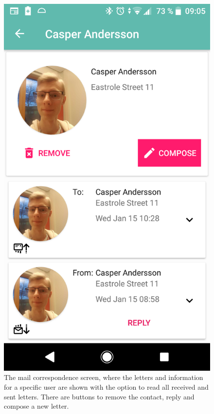 \documentclass[acmlarge, review=false, screen=true]{acmart}
\begin{document}
\begin{figure}[!tbp]
\begin{minipage}[b]{0.4\textwidth}
        \end{minipage}
        \hfill
        \begin{minipage}[b]{0.4\textwidth}
          \includegraphics[width=\textwidth]{images/usertouser.png}
          \caption{The mail correspondence screen, where the letters and information for a specific user are shown with the option to read all received and sent letters. There are buttons to remove the contact, reply and compose a new letter.}
          \label{fig:usertouser}
        \end{minipage}
      \end{figure}
\end{document}
